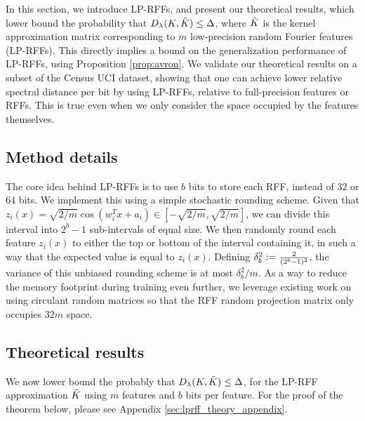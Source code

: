 In this section, we introduce LP-RFFs, and present our theoretical results, which lower bound the probability that $D_{\lambda}(K,\tilde{K}) \leq \Delta$, where $\tilde{K}$ is the kernel approximation matrix corresponding to $m$ low-precision random Fourier features (LP-RFFs). This directly implies a bound on the generalization performance of LP-RFFs, using Proposition \ref{prop:avron}. We validate our theoretical results on a subset of the Census UCI dataset, showing that one can achieve lower relative spectral distance per bit by using LP-RFFs, relative to full-precision \Nystrom features or RFFs.  This is true even when we only consider the space occupied by the features themselves.

\subsection{Method details}
\label{subsec:method_details}
The core idea behind LP-RFFs is to use $b$ bits to store each RFF, instead of $32$ or $64$ bits. We implement this using a simple stochastic rounding scheme. Given that $z_i(x) = \sqrt{2/m}\cos(w_i^T x + a_i) \in [-\sqrt{2/m},\sqrt{2/m}]$, we can divide this interval into $2^b - 1$ sub-intervals of equal size. We then randomly round each feature $z_i(x)$ to either the top or bottom of the interval containing it, in such a way that the expected value is equal to $z_i(x)$. Defining $\delta_b^2 := \frac{2}{(2^b-1)^2}$, the variance of this unbiased rounding scheme is at most $\delta_b^2/m$.  As a way to reduce the memory footprint during training even further, we leverage existing work on using circulant random matrices \citep{yu15} so that the RFF random projection matrix only occupies $32m$ space.

\subsection{Theoretical results}

We now lower bound the probably that $D_{\lambda}(K,\tilde{K}) \leq \Delta$, for the LP-RFF approximation $\tilde{K}$ using $m$ features and $b$ bits per feature.  For the proof of the theorem below, please see Appendix \ref{sec:lprff_theory_appendix}.

